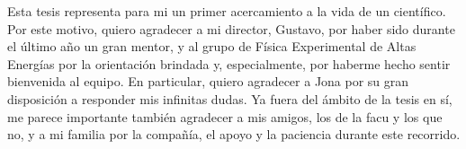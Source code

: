 
Esta tesis representa para mi un primer acercamiento a la vida de un científico. Por este motivo, quiero agradecer a mi director, Gustavo, por haber sido durante el último año un gran mentor, y al grupo de Física Experimental de Altas Energías por la orientación brindada y, especialmente, por haberme hecho sentir bienvenida al equipo. En particular, quiero agradecer a Jona por su gran disposición a responder mis infinitas dudas. Ya fuera del ámbito de la tesis en sí, me parece importante también agradecer a mis amigos, los de la facu y los que no, y a mi familia por la compañía, el apoyo y la paciencia durante este recorrido.


